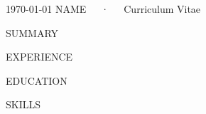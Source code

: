 \documentclass[11pt, a4paper]{awesome-cv}
\begin{document}
\makecvheader

\makecvfooter
  {\today}
  {{{NAME}}~~~·~~~Curriculum Vitae}
  {\thepage}



\begin{cvparagraph}
{{SUMMARY}}
\end{cvparagraph}


\begin{cventries}
{{EXPERIENCE}}
\end{cventries}


\begin{cventries}
{{EDUCATION}}
\end{cventries}


\begin{cvskillentries}
{{SKILLS}}
\end{cvskillentries}

\end{document}
